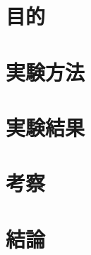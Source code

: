 \documentclass[a4paper, 11pt]{ltjsarticle}
\begin{document}
\section{目的}
\section{実験方法}
\section{実験結果}
\section{考察}
\section{結論}
\begin{thebibliography}{99}

\end{thebibliography}
\end{document}
